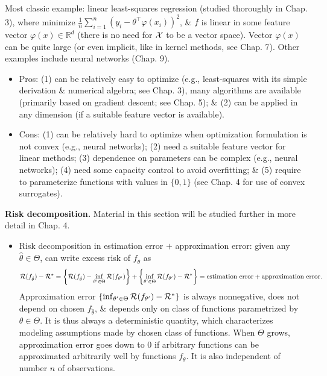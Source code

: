 \documentclass{article}
\begin{document}
\begin{enumerate}
\begin{itemize}
\begin{itemize}
\begin{itemize}
				Most classic example: linear least-squares regression (studied thoroughly in Chap. 3), where minimize $\frac{1}{n}\sum_{i=1}^n (y_i - \theta^\top\varphi(x_i))^2$, \& $f$ is linear in some feature vector $\varphi(x)\in\mathbb{R}^d$ (there is no need for ${\cal X}$ to be a vector space). Vector $\varphi(x)$ can be quite large (or even implicit, like in kernel methods, see Chap. 7). Other examples include neural networks (Chap. 9).
				\begin{itemize}
					\item Pros: (1) can be relatively easy to optimize (e.g., least-squares with its simple derivation \& numerical algebra; see Chap. 3), many algorithms are available (primarily based on gradient descent; see Chap. 5); \& (2) can be applied in any dimension (if a suitable feature vector is available).
					\item Cons: (1) can be relatively hard to optimize when optimization formulation is not convex (e.g., neural networks); (2) need a suitable feature vector for linear methods; (3) dependence on parameters can be complex (e.g., neural networks); (4) need some capacity control to avoid overfitting; \& (5) require to parameterize functions with values in $\{0,1\}$ (see Chap. 4 for use of convex surrogates).
				\end{itemize}
				{\bf Risk decomposition.} Material in this section will be studied further in more detail in Chap. 4.
				\begin{itemize}
					\item Risk decomposition in estimation error $+$ approximation error: given any $\hat{\theta}\in\Theta$, can write excess risk of $f_{\hat{\theta}}$ as
					\begin{equation}
						{\cal R}(f_{\hat{\theta}}) - {\cal R}^\star = \left\{{\cal R}(f_{\hat{\theta}}) - \inf_{\theta'\in\Theta} {\cal R}(f_{\theta'}) \right\} + \left\{\inf_{\theta'\in\Theta} {\cal R}(f_{\theta'}) - {\cal R}^*\right\} = \mbox{estimation error} + \mbox{approximation error}.
					\end{equation}
					Approximation error $\left\{\inf_{\theta'\in\Theta} {\cal R}(f_{\theta'}) - {\cal R}^*\right\}$ is always nonnegative, does not depend on chosen $f_{\hat{\theta}}$, \& depends only on class of functions parametrized by $\theta\in\Theta$. It is thus always a deterministic quantity, which characterizes modeling assumptions made by chosen class of functions. When $\Theta$ grows, approximation error goes down to 0 if arbitrary functions can be approximated arbitrarily well by functions $f_\theta$. It is also independent of number $n$ of observations.
					

\end{itemize}
\end{itemize}
\end{itemize}
\end{itemize}
\end{enumerate}
\end{document}
